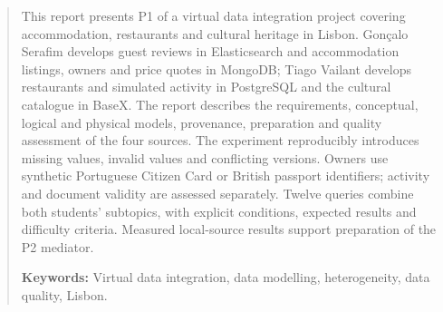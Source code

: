 \begin{abstract}
This report presents P1 of a virtual data integration project covering accommodation, restaurants and cultural heritage in Lisbon. Gonçalo Serafim develops guest reviews in Elasticsearch and accommodation listings, owners and price quotes in MongoDB; Tiago Vailant develops restaurants and simulated activity in PostgreSQL and the cultural catalogue in BaseX. The report describes the requirements, conceptual, logical and physical models, provenance, preparation and quality assessment of the four sources. The experiment reproducibly introduces missing values, invalid values and conflicting versions. Owners use synthetic Portuguese Citizen Card or British passport identifiers; activity and document validity are assessed separately. Twelve queries combine both students' subtopics, with explicit conditions, expected results and difficulty criteria. Measured local-source results support preparation of the P2 mediator.

\medskip\noindent\textbf{Keywords:} Virtual data integration, data modelling, heterogeneity, data quality, Lisbon.
\end{abstract}
